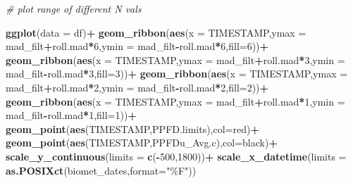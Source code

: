 \documentclass[
]{article}
\newenvironment{Shaded}{\begin{snugshade}}{\end{snugshade}}
\newcommand{\AttributeTok}[1]{\textcolor[rgb]{0.13,0.29,0.53}{#1}}
\newcommand{\CommentTok}[1]{\textcolor[rgb]{0.56,0.35,0.01}{\textit{#1}}}
\newcommand{\DecValTok}[1]{\textcolor[rgb]{0.00,0.00,0.81}{#1}}
\newcommand{\FunctionTok}[1]{\textcolor[rgb]{0.13,0.29,0.53}{\textbf{#1}}}
\newcommand{\NormalTok}[1]{#1}
\newcommand{\SpecialCharTok}[1]{\textcolor[rgb]{0.81,0.36,0.00}{\textbf{#1}}}
\newcommand{\StringTok}[1]{\textcolor[rgb]{0.31,0.60,0.02}{#1}}
\begin{document}
\begin{Shaded}
\begin{Highlighting}[]
\CommentTok{\# plot range of different N vals}

\FunctionTok{ggplot}\NormalTok{(}\AttributeTok{data =}\NormalTok{ df)}\SpecialCharTok{+}
  \FunctionTok{geom\_ribbon}\NormalTok{(}\FunctionTok{aes}\NormalTok{(}\AttributeTok{x =}\NormalTok{ TIMESTAMP,}\AttributeTok{ymax =}\NormalTok{ mad\_filt}\SpecialCharTok{+}\NormalTok{roll.mad}\SpecialCharTok{*}\DecValTok{6}\NormalTok{,}\AttributeTok{ymin =}\NormalTok{ mad\_filt}\SpecialCharTok{{-}}\NormalTok{roll.mad}\SpecialCharTok{*}\DecValTok{6}\NormalTok{,}\AttributeTok{fill=}\StringTok{\textquotesingle{}6\textquotesingle{}}\NormalTok{))}\SpecialCharTok{+}
  \FunctionTok{geom\_ribbon}\NormalTok{(}\FunctionTok{aes}\NormalTok{(}\AttributeTok{x =}\NormalTok{ TIMESTAMP,}\AttributeTok{ymax =}\NormalTok{ mad\_filt}\SpecialCharTok{+}\NormalTok{roll.mad}\SpecialCharTok{*}\DecValTok{3}\NormalTok{,}\AttributeTok{ymin =}\NormalTok{ mad\_filt}\SpecialCharTok{{-}}\NormalTok{roll.mad}\SpecialCharTok{*}\DecValTok{3}\NormalTok{,}\AttributeTok{fill=}\StringTok{\textquotesingle{}3\textquotesingle{}}\NormalTok{))}\SpecialCharTok{+}
  \FunctionTok{geom\_ribbon}\NormalTok{(}\FunctionTok{aes}\NormalTok{(}\AttributeTok{x =}\NormalTok{ TIMESTAMP,}\AttributeTok{ymax =}\NormalTok{ mad\_filt}\SpecialCharTok{+}\NormalTok{roll.mad}\SpecialCharTok{*}\DecValTok{2}\NormalTok{,}\AttributeTok{ymin =}\NormalTok{ mad\_filt}\SpecialCharTok{{-}}\NormalTok{roll.mad}\SpecialCharTok{*}\DecValTok{2}\NormalTok{,}\AttributeTok{fill=}\StringTok{\textquotesingle{}2\textquotesingle{}}\NormalTok{))}\SpecialCharTok{+}
  \FunctionTok{geom\_ribbon}\NormalTok{(}\FunctionTok{aes}\NormalTok{(}\AttributeTok{x =}\NormalTok{ TIMESTAMP,}\AttributeTok{ymax =}\NormalTok{ mad\_filt}\SpecialCharTok{+}\NormalTok{roll.mad}\SpecialCharTok{*}\DecValTok{1}\NormalTok{,}\AttributeTok{ymin =}\NormalTok{ mad\_filt}\SpecialCharTok{{-}}\NormalTok{roll.mad}\SpecialCharTok{*}\DecValTok{1}\NormalTok{,}\AttributeTok{fill=}\StringTok{\textquotesingle{}1\textquotesingle{}}\NormalTok{))}\SpecialCharTok{+}
  \FunctionTok{geom\_point}\NormalTok{(}\FunctionTok{aes}\NormalTok{(TIMESTAMP,PPFD.limits),}\AttributeTok{col=}\StringTok{\textquotesingle{}red\textquotesingle{}}\NormalTok{)}\SpecialCharTok{+}
  \FunctionTok{geom\_point}\NormalTok{(}\FunctionTok{aes}\NormalTok{(TIMESTAMP,PPFDu\_Avg.c),}\AttributeTok{col=}\StringTok{\textquotesingle{}black\textquotesingle{}}\NormalTok{)}\SpecialCharTok{+}
  \FunctionTok{scale\_y\_continuous}\NormalTok{(}\AttributeTok{limits =} \FunctionTok{c}\NormalTok{(}\SpecialCharTok{{-}}\DecValTok{500}\NormalTok{,}\DecValTok{1800}\NormalTok{))}\SpecialCharTok{+}
  \FunctionTok{scale\_x\_datetime}\NormalTok{(}\AttributeTok{limits =} \FunctionTok{as.POSIXct}\NormalTok{(biomet\_dates,}\AttributeTok{format=}\StringTok{"\%F"}\NormalTok{))}
\end{Highlighting}
\end{Shaded}
\end{document}
